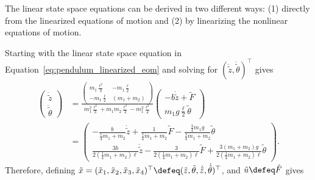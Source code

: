 The linear state space equations can be derived in two different ways: (1) directly from the linearized equations of motion and (2) by linearizing the nonlinear equations of motion.

Starting with the linear state space equation in Equation~\eqref{eq:pendulum_linearized_eom} and solving for $(\ddot{\tilde{z}}, \ddot{\tilde{\theta}})^\top$ gives
\begin{align*}
\begin{pmatrix} \ddot{\tilde{z}} \\ \ddot{\tilde{\theta}} \end{pmatrix} &= \frac{\begin{pmatrix} m_1\frac{\ell^2}{3} & -m_1\frac{\ell}2 \\ -m_1\frac{\ell}{2} & (m_1+m_2)\end{pmatrix}}{m_1^2\frac{\ell^2}{3}+m_1m_2\frac{\ell^2}{3}-m_1^2\frac{\ell^2}{4}}\begin{pmatrix} -b\dot{\tilde{z}}+\tilde{F} \\ m_1g\frac{\ell}{2}\tilde{\theta} \end{pmatrix} \\
&= \begin{pmatrix} -\frac{b}{\frac{1}{4}m_1 + m_2}\dot{\tilde{z}} + \frac{1}{\frac{1}{4}m_1 + m_2}\tilde{F} - \frac{\frac{3}{4} m_1g}{\frac{1}{4}m_1 + m_2}\tilde{\theta} \\ \frac{3b}{2(\frac{1}{4}m_1 + m_2)\ell}\dot{\tilde{z}} - \frac{3}{2( \frac{1}{4}m_1 + m_2)\ell}\tilde{F} + \frac{3 (m_1+m_2)g}{2 (\frac{1}{4}m_1 + m_2)\ell}\tilde{\theta} \end{pmatrix}.
\end{align*}
Therefore, defining $\tilde{x}=(\tilde{x}_1, \tilde{x}_2, \tilde{x}_3, \tilde{x}_4)^\top\defeq(\tilde{z},\tilde{\theta},\dot{\tilde{z}},\dot{\tilde{\theta}})^\top$, and $\tilde{u}\defeq \tilde{F}$ gives
